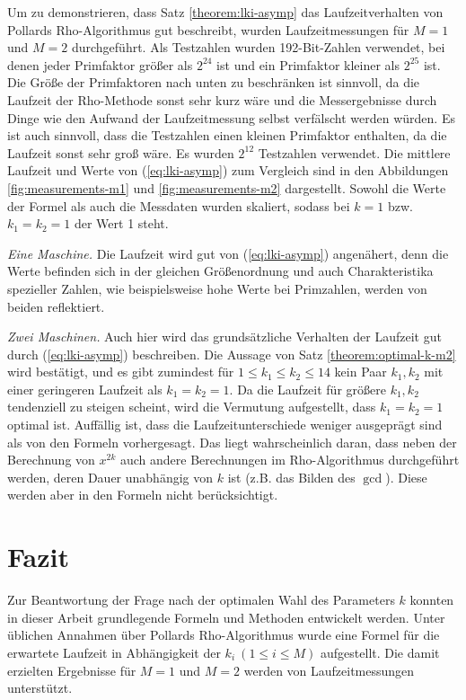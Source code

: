 \documentclass[a4paper, 11pt, ngerman]{article}
\theoremstyle{definition}
\theoremstyle{plain}
\theoremstyle{remark}
\begin{document}
Um zu demonstrieren, dass Satz \ref{theorem:lki-asymp} das Laufzeitverhalten von Pollards Rho-Algorithmus gut beschreibt, wurden Laufzeitmessungen für $M = 1$ und $M = 2$ durchgeführt. Als Testzahlen wurden 192-Bit-Zahlen verwendet, bei denen jeder Primfaktor größer als $2^{24}$ ist und ein Primfaktor kleiner als $2^{25}$ ist. Die Größe der Primfaktoren nach unten zu beschränken ist sinnvoll, da die Laufzeit der Rho-Methode sonst sehr kurz wäre und die Messergebnisse durch Dinge wie den Aufwand der Laufzeitmessung selbst verfälscht werden würden. Es ist auch sinnvoll, dass die Testzahlen einen kleinen Primfaktor enthalten, da die Laufzeit sonst sehr groß wäre. Es wurden $2^{12}$ Testzahlen verwendet. Die mittlere Laufzeit und Werte von (\ref{eq:lki-asymp}) zum Vergleich sind in den Abbildungen \ref{fig:measurements-m1} und \ref{fig:measurements-m2} dargestellt. Sowohl die Werte der Formel als auch die Messdaten wurden skaliert, sodass bei $k = 1$ bzw. $k_1 = k_2 = 1$ der Wert 1 steht.

\emph{Eine Maschine.} Die Laufzeit wird gut von (\ref{eq:lki-asymp}) angenähert, denn die Werte befinden sich in der gleichen Größenordnung und auch Charakteristika spezieller Zahlen, wie beispielsweise hohe Werte bei Primzahlen, werden von beiden reflektiert.

\emph{Zwei Maschinen.} Auch hier wird das grundsätzliche Verhalten der Laufzeit gut durch (\ref{eq:lki-asymp}) beschreiben. Die Aussage von Satz \ref{theorem:optimal-k-m2} wird bestätigt, und es gibt zumindest für $1 \le k_1 \le k_2 \le 14$ kein Paar $k_1, k_2$ mit einer geringeren Laufzeit als $k_1 = k_2 = 1$. Da die Laufzeit für größere $k_1, k_2$ tendenziell zu steigen scheint, wird die Vermutung aufgestellt, dass $k_1 = k_2 = 1$ optimal ist. Auffällig ist, dass die Laufzeitunterschiede weniger ausgeprägt sind als von den Formeln vorhergesagt. Das liegt wahrscheinlich daran, dass neben der Berechnung von $x^{2k}$ auch andere Berechnungen im Rho-Algorithmus durchgeführt werden, deren Dauer unabhängig von $k$ ist (z.B. das Bilden des $\gcd$). Diese werden aber in den Formeln nicht berücksichtigt.

\section{Fazit}

Zur Beantwortung der Frage nach der optimalen Wahl des Parameters $k$ konnten in dieser Arbeit grundlegende Formeln und Methoden entwickelt werden. Unter üblichen Annahmen über Pollards Rho-Algorithmus wurde eine Formel für die erwartete Laufzeit in Abhängigkeit der $k_i \ (1 \le i \le M)$ aufgestellt. Die damit erzielten Ergebnisse für $M = 1$ und $M = 2$ werden von Laufzeitmessungen unterstützt.
\end{document}
